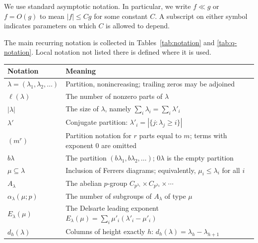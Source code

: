 \documentclass[a4paper,11pt,reqno]{amsart}
\theoremstyle{plain}
\theoremstyle{remark}
\numberwithin{equation}{section}
\newcommand{\card}[1]{\left\lvert #1\right\rvert}
\renewcommand{\leq}{\leqslant}
\renewcommand{\geq}{\geqslant}
\begin{document}
We use standard asymptotic notation. In particular, we write $f\ll g$ or
$f=O(g)$ to mean $|f|\leq Cg$ for some constant $C$. A subscript on either
symbol indicates parameters on which $C$ is allowed to depend.

The main recurring notation is collected in
Tables~\ref{tab:notation} and \ref{tab:q-notation}. Local notation not listed there is defined
where it is used.

\FloatBarrier
\begin{table}[htbp]
\centering
\footnotesize
\begingroup
\renewcommand{\arraystretch}{1.12}
\begin{tabular}{@{}p{}p{}@{}}
\toprule
Notation & Meaning \\
\midrule
$\lambda=(\lambda_1,\lambda_2,\ldots)$
& Partition, nonincreasing; trailing zeros may be adjoined \\

$\ell(\lambda)$
& The number of nonzero parts of $\lambda$ \\

$|\lambda|$
& The size of $\lambda$, namely $\sum_i\lambda_i=\sum_i\lambda'_i$ \\

$\lambda'$
& Conjugate partition: $\lambda'_i=\card{\{j:\lambda_j\geq i\}}$ \\

$(m^r)$
& Partition notation for $r$ parts equal to $m$; terms with exponent $0$
  are omitted \\

$b\lambda$
& The partition $(b\lambda_1,b\lambda_2,\ldots)$; $0\lambda$ is the empty
  partition \\

$\mu\subseteq\lambda$
& Inclusion of Ferrers diagrams; equivalently, $\mu_i\leq\lambda_i$ for all
  $i$ \\

$A_\lambda$
& The abelian $p$-group
  $C_{p^{\lambda_1}}\times C_{p^{\lambda_2}}\times\cdots$ \\

$\alpha_\lambda(\mu;p)$
& The number of subgroups of $A_\lambda$ of type $\mu$ \\

$E_\lambda(\mu)$
& The Delsarte leading exponent
  $E_\lambda(\mu)=\sum_i\mu'_i(\lambda'_i-\mu'_i)$ \\

$d_h(\lambda)$
& Columns of height exactly $h$: $d_h(\lambda)=\lambda_h-\lambda_{h+1}$ \\


\end{tabular}
\end{table}
\end{document}
